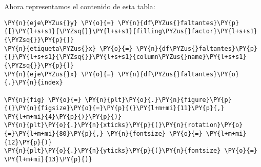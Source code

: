     Ahora representamos el contenido de esta tabla:

    \begin{tcolorbox}[breakable, size=fbox, boxrule=1pt, pad at break*=1mm,colback=cellbackground, colframe=cellborder]
\begin{Verbatim}[commandchars=\\\{\}]
\PY{n}{eje\PYZus{}y} \PY{o}{=} \PY{n}{df\PYZus{}faltantes}\PY{p}{[}\PY{l+s+s1}{\PYZsq{}}\PY{l+s+s1}{filling\PYZus{}factor}\PY{l+s+s1}{\PYZsq{}}\PY{p}{]} 
\PY{n}{etiqueta\PYZus{}x} \PY{o}{=} \PY{n}{df\PYZus{}faltantes}\PY{p}{[}\PY{l+s+s1}{\PYZsq{}}\PY{l+s+s1}{column\PYZus{}name}\PY{l+s+s1}{\PYZsq{}}\PY{p}{]}
\PY{n}{eje\PYZus{}x} \PY{o}{=} \PY{n}{df\PYZus{}faltantes}\PY{o}{.}\PY{n}{index}

\PY{n}{fig} \PY{o}{=} \PY{n}{plt}\PY{o}{.}\PY{n}{figure}\PY{p}{(}\PY{n}{figsize}\PY{o}{=}\PY{p}{(}\PY{l+m+mi}{11}\PY{p}{,} \PY{l+m+mi}{4}\PY{p}{)}\PY{p}{)}
\PY{n}{plt}\PY{o}{.}\PY{n}{xticks}\PY{p}{(}\PY{n}{rotation}\PY{o}{=}\PY{l+m+mi}{80}\PY{p}{,} \PY{n}{fontsize} \PY{o}{=} \PY{l+m+mi}{12}\PY{p}{)}
\PY{n}{plt}\PY{o}{.}\PY{n}{yticks}\PY{p}{(}\PY{n}{fontsize} \PY{o}{=} \PY{l+m+mi}{13}\PY{p}{)}


\end{Verbatim}
\end{tcolorbox}
